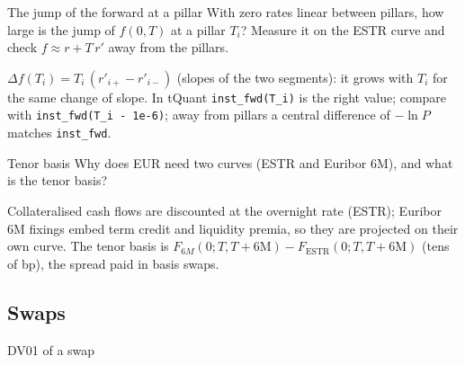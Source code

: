 \begin{question}{\Practice {}}{The jump of the forward at a pillar}
With zero rates linear between pillars, how large is the jump of $f(0,T)$ at a pillar $T_i$? Measure it on the
ESTR curve and check $f \approx r + T\,r'$ away from the pillars. 
\end{question}
\begin{answer}
$\Delta f(T_i) = T_i\,(r'_{i+} - r'_{i-})$ (slopes of the two segments): it grows with $T_i$ for the same change of
slope. In tQuant \texttt{inst\_fwd(T\_i)} is the right value; compare with
\texttt{inst\_fwd(T\_i - 1e-6)}; away from pillars a central difference of $-\ln P$ matches \texttt{inst\_fwd}.
\end{answer}

\begin{question}{\Theory {}}{Tenor basis}
Why does EUR need two curves (ESTR and Euribor 6M), and what is the tenor basis?
\end{question}
\begin{answer}
Collateralised cash flows are discounted at the overnight rate (ESTR); Euribor 6M fixings embed term credit and
liquidity premia, so they are projected on their own curve. The tenor basis is
$F_{6M}(0;T,T+6\mathrm{M}) - F_{\mathrm{ESTR}}(0;T,T+6\mathrm{M})$ (tens of bp), the spread paid in basis swaps.
\end{answer}

\subsection{Swaps}

\begin{question}{\Theory {}}{DV01 of a swap}
\end{question}
\begin{answer}
\end{answer}

